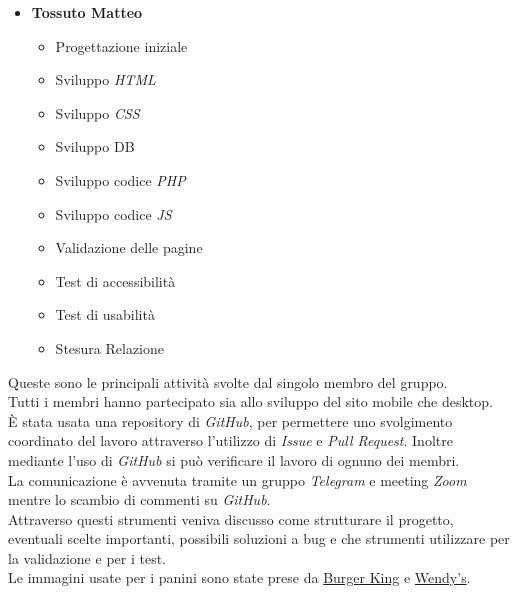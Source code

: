 \begin{itemize}
	\item \textbf{Tossuto Matteo}
	\begin{itemize}
		\item Progettazione iniziale
		\item Sviluppo \emph{HTML}
		\item Sviluppo \emph{CSS}
		\item Sviluppo DB
		\item Sviluppo codice \emph{PHP}
		\item Sviluppo codice \emph{JS}
		\item Validazione delle pagine
		\item Test di accessibilità
		\item Test di usabilità
		\item Stesura Relazione
	\end{itemize}
\end{itemize}

Queste sono le principali attività svolte dal singolo membro del gruppo.\\
Tutti i membri hanno partecipato sia allo sviluppo del sito mobile che desktop.\\
È stata usata una repository di \emph{GitHub}, per permettere uno svolgimento coordinato del lavoro attraverso l'utilizzo di \emph{Issue} e \emph{Pull Request}. Inoltre mediante l'uso di \emph{GitHub} si può verificare il lavoro di ognuno dei membri.\\
La comunicazione è avvenuta tramite un gruppo \emph{Telegram} e meeting \emph{Zoom} mentre lo scambio di commenti su \emph{GitHub}.\\
Attraverso questi strumenti veniva discusso come strutturare il progetto, eventuali scelte importanti, possibili soluzioni a bug e che strumenti utilizzare per la validazione e per i test.\\
Le immagini usate per i panini sono state prese da \href{https://www.burgerking.it/prodotti/meat/}{Burger King} e \href{https://order.wendys.com/category/100/hamburgers}{Wendy's}.